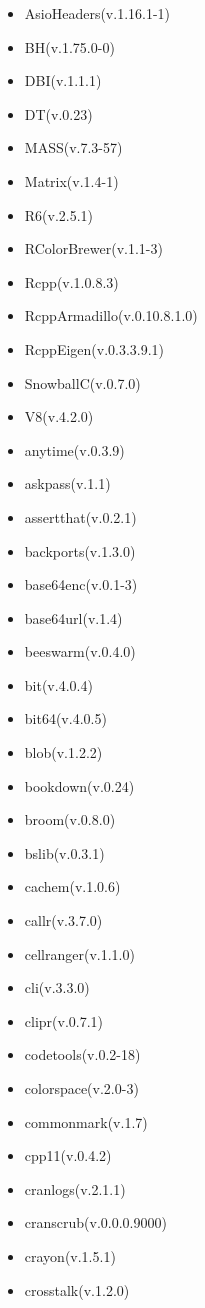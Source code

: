 \documentclass[
]{article}
\providecommand{\tightlist}{%
  \setlength{\itemsep}{0pt}\setlength{\parskip}{0pt}}
\begin{document}
\begin{itemize}
\tightlist
\item
  AsioHeaders(v.1.16.1-1)
\item
  BH(v.1.75.0-0)
\item
  DBI(v.1.1.1)
\item
  DT(v.0.23)
\item
  MASS(v.7.3-57)
\item
  Matrix(v.1.4-1)
\item
  R6(v.2.5.1)
\item
  RColorBrewer(v.1.1-3)
\item
  Rcpp(v.1.0.8.3)
\item
  RcppArmadillo(v.0.10.8.1.0)
\item
  RcppEigen(v.0.3.3.9.1)
\item
  SnowballC(v.0.7.0)
\item
  V8(v.4.2.0)
\item
  anytime(v.0.3.9)
\item
  askpass(v.1.1)
\item
  assertthat(v.0.2.1)
\item
  backports(v.1.3.0)
\item
  base64enc(v.0.1-3)
\item
  base64url(v.1.4)
\item
  beeswarm(v.0.4.0)
\item
  bit(v.4.0.4)
\item
  bit64(v.4.0.5)
\item
  blob(v.1.2.2)
\item
  bookdown(v.0.24)
\item
  broom(v.0.8.0)
\item
  bslib(v.0.3.1)
\item
  cachem(v.1.0.6)
\item
  callr(v.3.7.0)
\item
  cellranger(v.1.1.0)
\item
  cli(v.3.3.0)
\item
  clipr(v.0.7.1)
\item
  codetools(v.0.2-18)
\item
  colorspace(v.2.0-3)
\item
  commonmark(v.1.7)
\item
  cpp11(v.0.4.2)
\item
  cranlogs(v.2.1.1)
\item
  cranscrub(v.0.0.0.9000)
\item
  crayon(v.1.5.1)
\item
  crosstalk(v.1.2.0)

\end{itemize}
\end{document}
